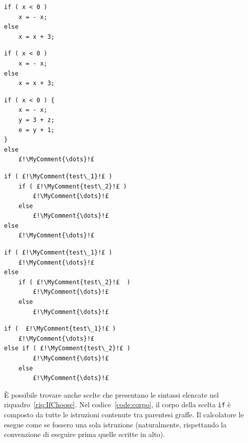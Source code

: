 \begin{code}
\begin{minipage}{0.45\columnwidth}
	\begin{lstlisting}[caption={\ },nolol]
if ( x < 0 )
	x = - x;
else
	x = x + 3;
	\end{lstlisting}
\end{minipage}	\hfill
\begin{minipage}{0.45\columnwidth}
	\begin{lstlisting}[caption={\ },nolol]
if ( x < 0 )
	x = - x;
else
	x = x + 3;
	\end{lstlisting}
\end{minipage}	\hfill
\begin{minipage}{0.45\columnwidth}
	\begin{lstlisting}[caption={\ },nolol,label={code:corpo}]
if ( x < 0 ) {
	x = - x;
	y = 3 + z;
	e = y + 1;
}
else
	£!\MyComment{\dots}!£
	\end{lstlisting}
\end{minipage}	\hfill
\begin{minipage}{0.45\columnwidth}
\begin{lstlisting}[caption={\ },nolol]
if ( £!\MyComment{test\_1}!£ )
	if ( £!\MyComment{test\_2}!£ )
		£!\MyComment{\dots}!£
	else
		£!\MyComment{\dots}!£
else
	£!\MyComment{\dots}!£
	\end{lstlisting}
\end{minipage}	\hfill
\begin{minipage}{0.45\columnwidth}
	\begin{lstlisting}[caption={\ },nolol]
if ( £!\MyComment{test\_1}!£ ) 
	£!\MyComment{\dots}!£
else
	if ( £!\MyComment{test\_2}!£  )
		£!\MyComment{\dots}!£
	else
		£!\MyComment{\dots}!£
	\end{lstlisting}
\end{minipage}	\hfill
\begin{minipage}{0.45\columnwidth}
	\begin{lstlisting}[caption={\ },nolol]
if (  £!\MyComment{test\_1}!£ ) 
	£!\MyComment{\dots}!£
else if ( £!\MyComment{test\_2}!£ )
		£!\MyComment{\dots}!£
	else
		£!\MyComment{\dots}!£
	\end{lstlisting}
\end{minipage}
\caption{Sintassi della scelta \lstinline!if!.}
\label{riq:IfChoose}
\end{code}
È possibile trovare anche scelte che presentano le sintassi elencate nel riquadro~\ref{riq:IfChoose}.
Nel codice~\ref{code:corpo}, il corpo della scelta \lstinline!if! è composto da tutte le istruzioni contenute tra parentesi graffe.
Il calcolatore le esegue come se fossero una sola istruzione (naturalmente, rispettando la convenzione di eseguire prima quelle scritte  in alto).

